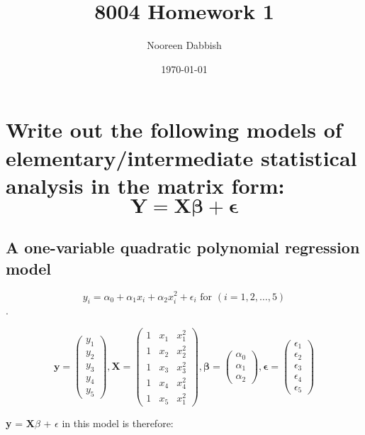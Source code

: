 \documentclass[11pt]{article}
\title{8004 Homework 1}
\author{Nooreen Dabbish}
\date{\today}
\begin{document}
\maketitle


\section{Write out the following models of elementary/intermediate statistical analysis in the matrix form: $$ \mathbf{Y} = \mathbf{X\beta} +\mathbf{\epsilon} $$}
\label{sec-1}
\subsection{A one-variable quadratic polynomial regression model}
\label{sec-1-1}

$$y_i = \alpha_0 + \alpha_1x_i + \alpha_2 x_i^2 + \epsilon_i \textrm{ for }   (i = 1,2,\ldots,5)$$. 

$$\mathbf{y} = \begin{pmatrix} y_1 \\ y_2 \\ y_3
\\ y_4\\ y_5\end{pmatrix},
\mathbf{X}= \begin{pmatrix} 1 & x_1 & x_1^2 \\ 
                            1 & x_2 & x_2^2 \\ 
                            1 & x_3 & x_3^2 \\ 
                            1 & x_4 & x_4^2 \\ 
                            1 & x_5 & x_1^2 \end{pmatrix},
\mathbf{\beta} = \begin{pmatrix} \alpha_0 \\ \alpha_1 \\ \alpha_2
\end{pmatrix}, 
\mathbf{\epsilon} = \begin{pmatrix} \epsilon_1 \\ \epsilon_2 \\
\epsilon_3 \\ \epsilon_4 \\ \epsilon_5 \end{pmatrix}$$

\textbf{y} = \textbf{X$\beta$} + \textbf{$\epsilon$}  in this model is therefore:
\end{document}
